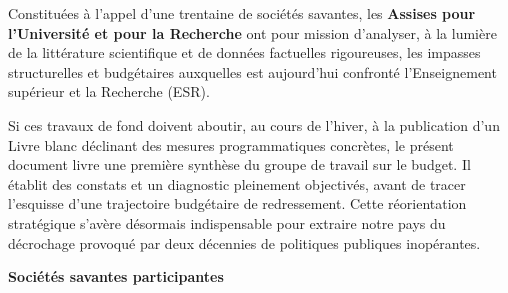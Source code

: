 \clearpage
\thispagestyle{empty}

{\small\sffamily

Constituées à l'appel d'une trentaine de sociétés savantes, les
\textbf{Assises pour l'Université et pour la Recherche} ont pour mission
d'analyser, à la lumière de la littérature scientifique et de données
factuelles rigoureuses, les impasses structurelles et budgétaires
auxquelles est aujourd'hui confronté l'Enseignement supérieur et la
Recherche (ESR).

Si ces travaux de fond doivent aboutir, au cours de l'hiver, à la
publication d'un Livre blanc déclinant des mesures programmatiques
concrètes, le présent document livre une première synthèse du groupe de
travail sur le budget. Il établit des constats et un diagnostic
pleinement objectivés, avant de tracer l'esquisse d'une trajectoire
budgétaire de redressement. Cette réorientation stratégique s'avère
désormais indispensable pour extraire notre pays du décrochage provoqué
par deux décennies de politiques publiques inopérantes.
}

\vspace{6mm}

\begin{center}
  {\sffamily\bfseries\Large Sociétés savantes participantes}
\end{center}

\vspace{1mm}

